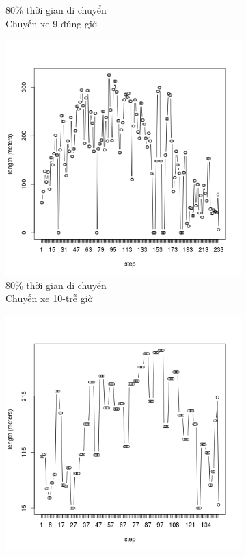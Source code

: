 \documentclass[a4paper, 13pt]{report}
\begin{document}
\begin{figure}
\begin{subfigure}[b]{0.25\textwidth}
                \caption*{80\% thời gian di chuyển\\Chuyến xe 9-đúng giờ}
        \end{subfigure}%
        \begin{subfigure}[b]{0.25\textwidth}
                \includegraphics[width=\linewidth]{test10}
                \caption*{80\% thời gian di chuyển\\Chuyến xe 10-trễ giờ}
        \end{subfigure}%
        \begin{subfigure}[b]{0.25\textwidth}
                \includegraphics[width=\linewidth]{test11}

\end{subfigure}
\end{figure}
\end{document}
